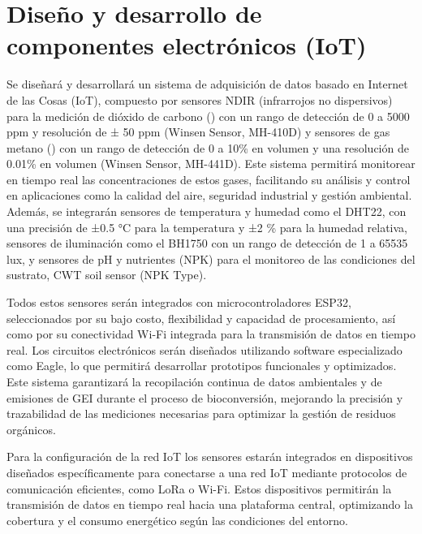 \section{Diseño y desarrollo de componentes electrónicos (IoT)}

Se diseñará y desarrollará un sistema de adquisición de datos basado en Internet de las Cosas (IoT), compuesto por sensores NDIR (infrarrojos no dispersivos) para la medición de dióxido de carbono () con un rango de detección de 0 a 5000 ppm y resolución de ± 50 ppm (Winsen Sensor, MH-410D) y sensores de gas metano () con un rango de detección de 0 a 10\% en volumen y una resolución de 0.01\% en volumen (Winsen Sensor, MH-441D). Este sistema permitirá monitorear en tiempo real las concentraciones de estos gases, facilitando su análisis y control en aplicaciones como la calidad del aire, seguridad industrial y gestión ambiental.  
Además, se integrarán sensores de temperatura y humedad como el DHT22, con una precisión de ±0.5 °C para la temperatura y ±2 \% para la humedad relativa, sensores de iluminación como el BH1750 con un rango de detección de 1 a 65535 lux, y sensores de pH y nutrientes (NPK) para el monitoreo de las condiciones del sustrato, CWT soil sensor (NPK Type).

Todos estos sensores serán integrados con microcontroladores ESP32, seleccionados por su bajo costo, flexibilidad y capacidad de procesamiento, así como por su conectividad Wi-Fi integrada para la transmisión de datos en tiempo real. Los circuitos electrónicos serán diseñados utilizando software especializado como Eagle, lo que permitirá desarrollar prototipos funcionales y optimizados. Este sistema garantizará la recopilación continua de datos ambientales y de emisiones de GEI durante el proceso de bioconversión, mejorando la precisión y trazabilidad de las mediciones necesarias para optimizar la gestión de residuos orgánicos.

Para la configuración de la red IoT los sensores estarán integrados en dispositivos diseñados específicamente para conectarse a una red IoT mediante protocolos de comunicación eficientes, como LoRa o Wi-Fi. Estos dispositivos permitirán la transmisión de datos en tiempo real hacia una plataforma central, optimizando la cobertura y el consumo energético según las condiciones del entorno.
